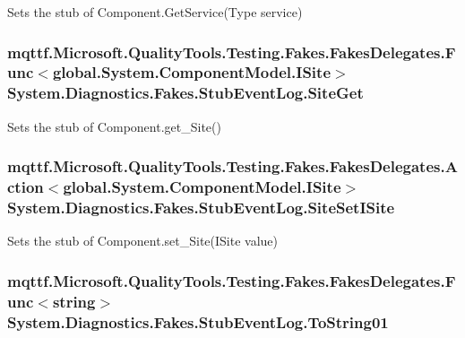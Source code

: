 Sets the stub of Component.\-Get\-Service(\-Type service)

\hypertarget{class_system_1_1_diagnostics_1_1_fakes_1_1_stub_event_log_afc608b16c8fe4fd0fa7e704df725c218}{
\subsubsection[{Site\-Get}]{\setlength{\rightskip}{0pt plus 5cm}mqttf.\-Microsoft.\-Quality\-Tools.\-Testing.\-Fakes.\-Fakes\-Delegates.\-Func$<$global.\-System.\-Component\-Model.\-I\-Site$>$ System.\-Diagnostics.\-Fakes.\-Stub\-Event\-Log.\-Site\-Get}}\label{class_system_1_1_diagnostics_1_1_fakes_1_1_stub_event_log_afc608b16c8fe4fd0fa7e704df725c218}


Sets the stub of Component.\-get\-\_\-\-Site()

\hypertarget{class_system_1_1_diagnostics_1_1_fakes_1_1_stub_event_log_a70943090351cd470ce18f53e92b37465}{
\subsubsection[{Site\-Set\-I\-Site}]{\setlength{\rightskip}{0pt plus 5cm}mqttf.\-Microsoft.\-Quality\-Tools.\-Testing.\-Fakes.\-Fakes\-Delegates.\-Action$<$global.\-System.\-Component\-Model.\-I\-Site$>$ System.\-Diagnostics.\-Fakes.\-Stub\-Event\-Log.\-Site\-Set\-I\-Site}}\label{class_system_1_1_diagnostics_1_1_fakes_1_1_stub_event_log_a70943090351cd470ce18f53e92b37465}


Sets the stub of Component.\-set\-\_\-\-Site(\-I\-Site value)

\hypertarget{class_system_1_1_diagnostics_1_1_fakes_1_1_stub_event_log_ae55cbb43de614a6f392a0230d09d6e48}{
\subsubsection[{To\-String01}]{\setlength{\rightskip}{0pt plus 5cm}mqttf.\-Microsoft.\-Quality\-Tools.\-Testing.\-Fakes.\-Fakes\-Delegates.\-Func$<$string$>$ System.\-Diagnostics.\-Fakes.\-Stub\-Event\-Log.\-To\-String01}}\label{class_system_1_1_diagnostics_1_1_fakes_1_1_stub_event_log_ae55cbb43de614a6f392a0230d09d6e48}


